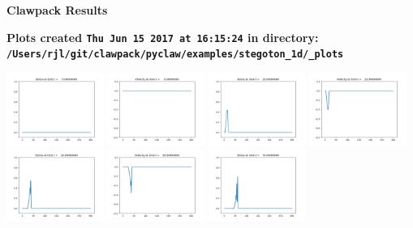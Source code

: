 \documentclass[11pt]{article}
\begin{document}
        \begin{center}{\Large\bf Clawpack Results}\vskip 5pt
        
        \bf Plots created {\tt Thu Jun 15 2017 at 16:15:24} in directory: \vskip 5pt
        \verb+/Users/rjl/git/clawpack/pyclaw/examples/stegoton_1d/_plots+
        \end{center}
        \vskip 5pt
        \includegraphics[width=0.2375\textwidth]{frame0000fig1.png}
\includegraphics[width=0.2375\textwidth]{frame0000fig2.png}
\includegraphics[width=0.2375\textwidth]{frame0001fig1.png}
\includegraphics[width=0.2375\textwidth]{frame0001fig2.png}
\vskip 10pt 
\includegraphics[width=0.2375\textwidth]{frame0002fig1.png}
\includegraphics[width=0.2375\textwidth]{frame0002fig2.png}
\includegraphics[width=0.2375\textwidth]{frame0003fig1.png}
\end{document}
